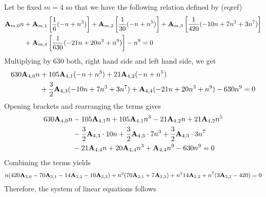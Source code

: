 \begin{examp}
    Let be fixed $m=4$ so that we have the following relation defined by (eqref)
    \begin{equation*}
        \begin{split}
            {\mathbf{A}} \sb{m,0} n
            &+ {\mathbf{A}} \sb{m,1} \left[ \frac{1}{6} (-n + n^3) \right]
            + {\mathbf{A}} \sb{m,2} \left[ \frac{1}{30} (-n + n^5) \right]
            + {\mathbf{A}} \sb{m,3} \left[ \frac{1}{420} (-10 n + 7 n^3 + 3 n^7) \right] \\
            &+ {\mathbf{A}} \sb{m,4} \left[ \frac{1}{630} (-21 n + 20 n^3 + n^9) \right] - n^9 = 0
        \end{split}
    \end{equation*}
    Multiplying by $630$ both, right hand side and left hand side, we get
    \begin{equation*}
        \begin{split}
            630 {\mathbf{A}} \sb{4,0} n
            &+ 105 {\mathbf{A}} \sb{4,1} (-n + n^3) + 21 {\mathbf{A}} \sb{4,2} (-n + n^5) \\
            &+ \frac{3}{2} {\mathbf{A}} \sb{4,3} (-10 n + 7 n^3 + 3 n^7) + {\mathbf{A}} \sb{4,4} (-21 n + 20 n^3 + n^9) - 630 n^9 = 0
        \end{split}
    \end{equation*}
    Opening brackets and rearranging the terms gives
    \begin{equation*}
        \begin{split}
            630 {\mathbf{A}} \sb{4,0} n
            &- 105 {\mathbf{A}} \sb{4,1} n + 105 {\mathbf{A}} \sb{4,1} n ^3 - 21 {\mathbf{A}} \sb{4,2} n + 21 {\mathbf{A}} \sb{4,2} n^5 \\
            &- \frac{3}{2} {\mathbf{A}} \sb{4,3} \cdot 10n + \frac{3}{2} {\mathbf{A}} \sb{4,3} \cdot 7n^3 + \frac{3}{2} {\mathbf{A}} \sb{4,3} \cdot 3n^7 \\
            &-21 {\mathbf{A}} \sb{4,4} n + 20 {\mathbf{A}} \sb{4,4} n^3 + {\mathbf{A}} \sb{4,4} n ^9 - 630 n^9 = 0
        \end{split}
    \end{equation*}
    Combining the terms yields
    \begin{equation*}
        \begin{split}
            n (420 {\mathbf{A}} \sb{3,0} - 70 {\mathbf{A}} \sb{3,1} - 14 {\mathbf{A}} \sb{3,2} - 10 {\mathbf{A}} \sb{3,3})
            + n^3 (70 {\mathbf{A}} \sb{3,1} + 7 {\mathbf{A}} \sb{3,3})
            + n^5 14 {\mathbf{A}} \sb{3,2}
            + n^7 (3 {\mathbf{A}} \sb{3,3} - 420)
            = 0
        \end{split}
    \end{equation*}
    Therefore, the system of linear equations follows

\end{examp}
